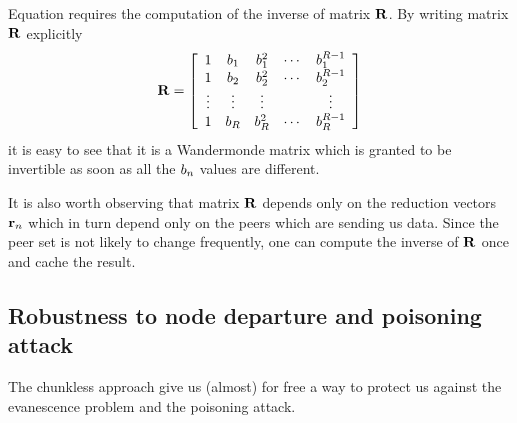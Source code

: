 \documentclass{medusabook}
\begin{document}
\begin{commento}
Equation  requires the computation of the inverse
of matrix ${\mathbf R}$.  By writing matrix ${\mathbf R}$ explicitly 
%
\begin{equation}
\label{eq:5;medusa_book}
{\mathbf R}  =
\left[ 
  \begin{array}{ccccc}
    1 & b_1  & b_1^2 & \cdots & b_1^{R-1} \\
    1 & b_2  & b_2^2 & \cdots & b_2^{R-1} \\
    \vdots & \vdots &    \vdots    &        & \vdots \\
    1 & b_R  & b_R^2 
          & \cdots & b_R^{R-1} 
  \end{array}
\right]
\end{equation}
%
it is easy to see that it is a Wandermonde matrix which is granted to
be invertible as soon as all the $b_n$ values are different.

It is also worth observing that matrix ${\mathbf R}$ depends only on the
reduction vectors ${\mathbf r}_n$ which in turn depend only on the peers
which are sending us data.  Since the peer set is not likely to change
frequently, one can compute the inverse of ${\mathbf R}$ once and cache
the result.
\end{commento}

\subsection{Robustness to node departure and poisoning attack}
\label{sub:1.0.0;medusa_book}

The chunkless approach give us (almost) for free a way to protect us
against the evanescence problem and the poisoning attack.
\end{document}
